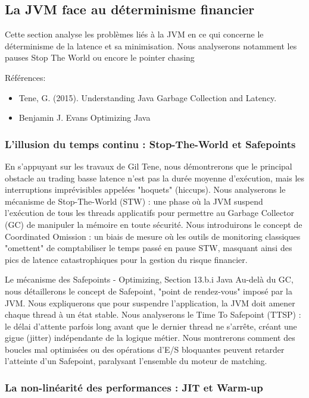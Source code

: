 \subsection{La JVM face au déterminisme financier}

Cette section analyse les problèmes liés à la JVM en ce qui concerne le déterminisme de la latence et sa minimisation. Nous analyserons notamment les pauses Stop The World ou encore le pointer chasing

Références: 

\begin{itemize}
    \item Tene, G. (2015). Understanding Java Garbage Collection and Latency.
    \item Benjamin J. Evans Optimizing Java
\end{itemize}

\subsubsection{L'illusion du temps continu : Stop-The-World et Safepoints}

En s'appuyant sur les travaux de Gil Tene, nous démontrerons que le principal obstacle au trading basse latence n'est pas la durée moyenne d'exécution, mais les interruptions imprévisibles appelées "hoquets" (hiccups). Nous analyserons le mécanisme de Stop-The-World (STW) : une phase où la JVM suspend l'exécution de tous les threads applicatifs pour permettre au Garbage Collector (GC) de manipuler la mémoire en toute sécurité. Nous introduirons le concept de Coordinated Omission : un biais de mesure où les outils de monitoring classiques "omettent" de comptabiliser le temps passé en pause STW, masquant ainsi des pics de latence catastrophiques pour la gestion du risque financier.

Le mécanisme des Safepoints - Optimizing, Section 13.b.i Java Au-delà du GC, nous détaillerons le concept de Safepoint, "point de rendez-vous" imposé par la JVM. Nous expliquerons que pour suspendre l'application, la JVM doit amener chaque thread à un état stable. Nous analyserons le Time To Safepoint (TTSP) : le délai d'attente parfois long avant que le dernier thread ne s'arrête, créant une gigue (jitter) indépendante de la logique métier.
Nous montrerons comment des boucles mal optimisées ou des opérations d'E/S bloquantes peuvent retarder l'atteinte d'un Safepoint, paralysant l'ensemble du moteur de matching.

\subsubsection{La non-linéarité des performances : JIT et Warm-up}

